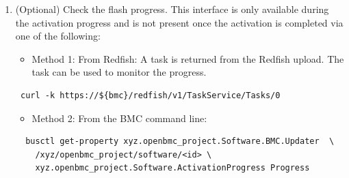 \begin{enumerate}
  \begin{itemize}
  \tightlist
  \item
    Method 1: From the BMC command line:
  \end{itemize}

\begin{verbatim}
  busctl set-property xyz.openbmc_project.Software.BMC.Updater \
    /xyz/openbmc_project/software/<id> \
    xyz.openbmc_project.Software.Activation RequestedActivation s \
    xyz.openbmc_project.Software.Activation.RequestedActivations.Active
\end{verbatim}

  \begin{itemize}
  \tightlist
  \item
    Method 2: Using the REST API:
  \end{itemize}

\begin{verbatim}
  curl -b cjar -k -H "Content-Type: application/json" -X PUT \
    -d '{"data":
    "xyz.openbmc_project.Software.Activation.RequestedActivations.Active"}' \
    https://${bmc}/xyz/openbmc_project/software/<id>/attr/RequestedActivation
\end{verbatim}
\item
  (Optional) Check the flash progress. This interface is only available
  during the activation progress and is not present once the activation
  is completed via one of the following:

  \begin{itemize}
  \tightlist
  \item
    Method 1: From Redfish: A task is returned from the Redfish upload.
    The task can be used to monitor the progress.
  \end{itemize}

\begin{verbatim}
 curl -k https://${bmc}/redfish/v1/TaskService/Tasks/0
\end{verbatim}

  \begin{itemize}
  \tightlist
  \item
    Method 2: From the BMC command line:
  \end{itemize}

\begin{verbatim}
  busctl get-property xyz.openbmc_project.Software.BMC.Updater  \
    /xyz/openbmc_project/software/<id> \
    xyz.openbmc_project.Software.ActivationProgress Progress
\end{verbatim}


\end{enumerate}

